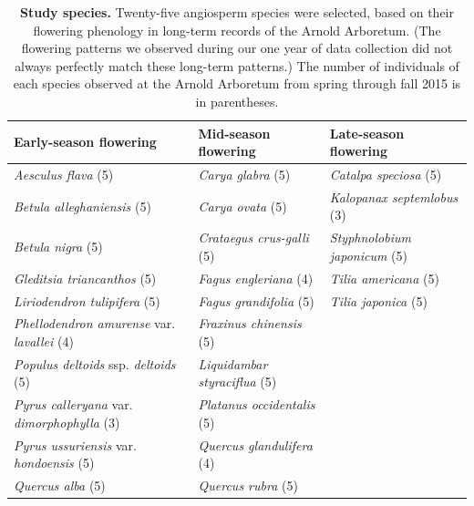 \documentclass{article}
\begin{document}
\begin{table}[p]
  \caption{\textbf{Study species.} Twenty-five angiosperm species were selected, based on their flowering phenology in long-term records of the Arnold Arboretum. (The flowering patterns we observed during our one year of data collection did not always perfectly match these long-term patterns.) The number of individuals of each species observed at the Arnold Arboretum from spring through fall 2015 is in parentheses.}
\begin{footnotesize} 
   \begin{tabular}{| p{5.5cm} | p{5.5cm} | p{5.5cm} |}
    \hline
  \bf{Early-season flowering} & \bf{Mid-season flowering} & \bf{Late-season flowering} \\ \hline
    \textit{Aesculus flava} (5) & \textit{Carya glabra} (5) & \textit{Catalpa speciosa} (5) \\ 
    \textit{Betula alleghaniensis} (5) & \textit{Carya ovata} (5) & \textit{Kalopanax septemlobus} (3) \\ 
    \textit{Betula nigra} (5) & \textit{Crataegus crus-galli} (5) & \textit{Styphnolobium japonicum} (5) \\ 
\textit{Gleditsia triancanthos} (5) & \textit{Fagus engleriana} (4) & \textit{Tilia americana} (5) \\ 
\textit{Liriodendron tulipifera} (5) & \textit{Fagus grandifolia} (5) & \textit{Tilia japonica} (5) \\ 
\textit{Phellodendron amurense} var. \textit{lavallei} (4) & \textit{Fraxinus chinensis} (5) &\\ \textit{Populus deltoids} ssp. \textit{deltoids} (5) & \textit{Liquidambar styraciflua} (5) & \\ 
\textit{Pyrus calleryana} var. \textit{dimorphophylla} (3) & \textit{Platanus occidentalis} (5) & \\ 
\textit{Pyrus ussuriensis} var. \textit{hondoensis} (5) & \textit{Quercus glandulifera} (4) & \\ \textit{Quercus alba} (5) & \textit{Quercus rubra} (5) &  \\ \hline
     \end{tabular}    
\end{footnotesize} 
    \end{table}
\clearpage
\end{document}
